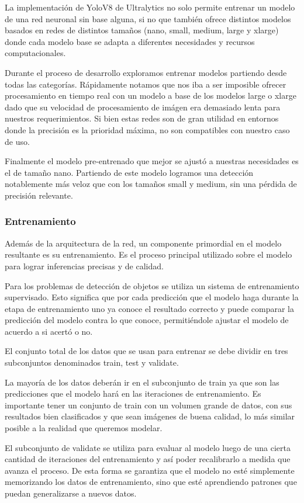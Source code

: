\documentclass[a4paper]{article}
\begin{document}
La implementación de YoloV8 de Ultralytics no solo permite entrenar un modelo de una red neuronal sin base alguna, si no que también ofrece distintos modelos basados en redes de distintos tamaños (nano, small, medium, large y xlarge) donde cada modelo base se adapta a diferentes necesidades y recursos computacionales.

Durante el proceso de desarrollo exploramos entrenar modelos partiendo desde todas las categorías. Rápidamente notamos que nos iba a ser imposible ofrecer procesamiento en tiempo real con un modelo a base de los modelos large o xlarge dado que su velocidad de procesamiento de imágen era demasiado lenta para nuestros requerimientos. Si bien estas redes son de gran utilidad en entornos donde la precisión es la prioridad máxima, no son compatibles con nuestro caso de uso.

Finalmente el modelo pre-entrenado que mejor se ajustó a nuestras necesidades es el de tamaño nano. Partiendo de este modelo logramos una detección notablemente más veloz que con los tamaños small y medium, sin una pérdida de precisión relevante.

\subsubsection{Entrenamiento}

Además de la arquitectura de la red, un componente primordial en el modelo resultante es su entrenamiento. Es el proceso principal utilizado sobre el modelo para lograr inferencias precisas y de calidad.

Para los problemas de detección de objetos se utiliza un sistema de entrenamiento supervisado. Esto significa que por cada predicción que el modelo haga durante la etapa de entrenamiento uno ya conoce el resultado correcto y puede comparar la predicción del modelo contra lo que conoce, permitiéndole ajustar el modelo de acuerdo a si acertó o no.

El conjunto total de los datos que se usan para entrenar se debe dividir en tres subconjuntos denominados train, test y validate.

La mayoría de los datos deberán ir en el subconjunto de train ya que son las predicciones que el modelo hará en las iteraciones de entrenamiento. Es importante tener un conjunto de train con un volumen grande de datos, con sus resultados bien clasificados y que sean imágenes de buena calidad, lo más similar posible a la realidad que queremos modelar.

El subconjunto de validate se utiliza para evaluar al modelo luego de una cierta cantidad de iteraciones del entrenamiento y así poder recalibrarlo a medida que avanza el proceso. De esta forma se garantiza que el modelo no esté simplemente memorizando los datos de entrenamiento, sino que esté aprendiendo patrones que puedan generalizarse a nuevos datos.
\end{document}
